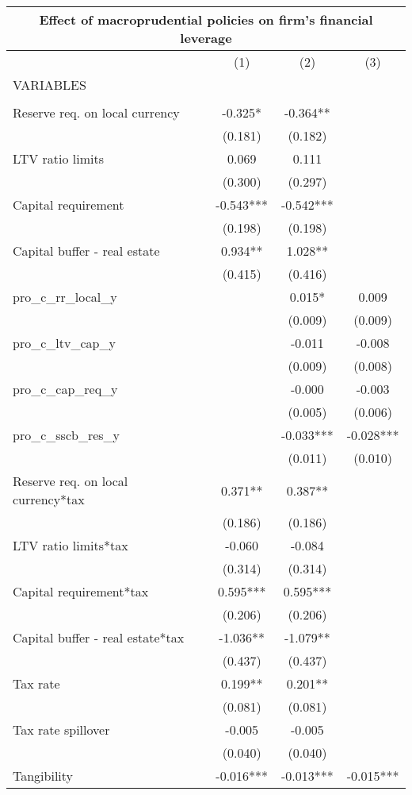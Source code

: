 \begin{tabular}{lccc}
\multicolumn{4}{c}{Effect of macroprudential policies on firm's financial leverage} \\ \hline
 & (1) & (2) & (3) \\
VARIABLES &  &  &  \\ \hline
 &  &  &  \\
Reserve req. on local currency & -0.325* & -0.364** &  \\
 & (0.181) & (0.182) &  \\
LTV ratio limits & 0.069 & 0.111 &  \\
 & (0.300) & (0.297) &  \\
Capital requirement & -0.543*** & -0.542*** &  \\
 & (0.198) & (0.198) &  \\
Capital buffer - real estate & 0.934** & 1.028** &  \\
 & (0.415) & (0.416) &  \\
pro\_c\_rr\_local\_y &  & 0.015* & 0.009 \\
 &  & (0.009) & (0.009) \\
pro\_c\_ltv\_cap\_y &  & -0.011 & -0.008 \\
 &  & (0.009) & (0.008) \\
pro\_c\_cap\_req\_y &  & -0.000 & -0.003 \\
 &  & (0.005) & (0.006) \\
pro\_c\_sscb\_res\_y &  & -0.033*** & -0.028*** \\
 &  & (0.011) & (0.010) \\
Reserve req. on local currency*tax & 0.371** & 0.387** &  \\
 & (0.186) & (0.186) &  \\
LTV ratio limits*tax & -0.060 & -0.084 &  \\
 & (0.314) & (0.314) &  \\
Capital requirement*tax & 0.595*** & 0.595*** &  \\
 & (0.206) & (0.206) &  \\
Capital buffer - real estate*tax & -1.036** & -1.079** &  \\
 & (0.437) & (0.437) &  \\
Tax rate & 0.199** & 0.201** &  \\
 & (0.081) & (0.081) &  \\
Tax rate spillover & -0.005 & -0.005 &  \\
 & (0.040) & (0.040) &  \\
Tangibility & -0.016*** & -0.013*** & -0.015*** \\

\end{tabular}
